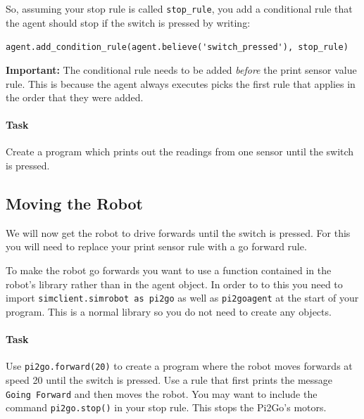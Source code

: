 \documentclass[a4,12pt]{article}
\begin{document}
So, assuming your stop rule is called \lstinline{stop_rule}, you add a conditional rule that the agent should stop if the switch is pressed by writing:

\medskip
\lstinline{agent.add_condition_rule(agent.believe('switch_pressed'), stop_rule)}
\medskip

{\bf Important:}  The conditional rule needs to be added \emph{before} the print sensor value rule.  This is because the agent always executes picks the first rule that applies in the order that they were added.



\paragraph{Task} Create a program which prints out the readings from one sensor until the switch is pressed.

\subsection{Moving the Robot}
\label{sec:moving}

We will now get the robot to drive forwards until the switch is pressed.  For this you will need to replace your print sensor rule with a go forward rule.

To make the robot go forwards you want to use a function contained in the robot's library rather than in the agent object.  In order to to this you need to import \lstinline{simclient.simrobot as pi2go} as well as \lstinline{pi2goagent} at the start of your program.   This is a normal library so you do not need to create any objects.  

\paragraph{Task} Use \lstinline{pi2go.forward(20)} to create a program where the robot moves forwards at speed 20 until the switch is pressed.  Use a rule that first prints the message \lstinline{Going Forward} and then moves the robot.  You may want to include the command \lstinline{pi2go.stop()} in your stop rule.  This stops the Pi2Go's motors.
\end{document}
